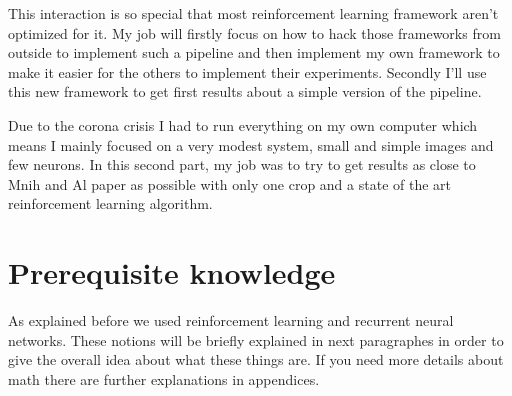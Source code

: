 \documentclass[11pt]{article}
\begin{document}
This interaction is so special that most reinforcement learning framework aren't optimized for it. My job will firstly focus on how to hack those frameworks from outside to implement such a pipeline and then implement my own framework to make it easier for the others to implement their experiments. Secondly I'll use this new framework to get first results about a simple version of the pipeline.

Due to the corona crisis I had to run everything on my own computer which means I mainly focused on a very modest system, small and simple images and few neurons. In this second part, my job was to try to get results as close to Mnih and Al paper as possible with only one crop and a state of the art reinforcement learning algorithm.

\section{Prerequisite knowledge}
As explained before we used reinforcement learning and recurrent neural networks. These notions will be briefly explained in next paragraphes in order to give the overall idea about what these things are. If you need more details about math there are further explanations in appendices.
\end{document}
